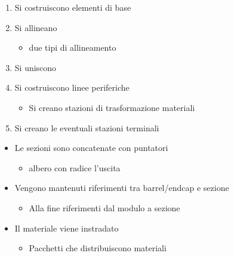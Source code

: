 \documentclass[pdftex, 11pt]{beamer}
\begin{document}
\begin{frame}
  \noindent\begin{minipage}[t]{0.5\linewidth}
    \begin{enumerate}
    \item<2-> Si \alert{costruiscono} elementi di base
    \item<3-> Si \alert{allineano}
      \begin{itemize}
      \item<3-> due tipi di allineamento
      \end{itemize}
    \item<5-> Si \alert{uniscono}
    \item<6-> Si costruiscono linee periferiche
      \begin{itemize}
      \item<6-> Si creano \alert{stazioni} di trasformazione materiali
      \end{itemize}
    \item<7-> Si creano le eventuali stazioni \alert{terminali}
    \end{enumerate}
  \end{minipage}%
  \begin{minipage}[t]{0.5\linewidth}
    \begin{itemize}
    \item<8-> Le sezioni sono concatenate con puntatori
      \begin{itemize}
      \item<8-> \alert{albero} con radice l'uscita
      \end{itemize}
    \item<8-> Vengono mantenuti {riferimenti} tra barrel/endcap e
      sezione 
      \begin{itemize}
      \item<8-> Alla fine riferimenti dal modulo a sezione
      \end{itemize}
    \item<8-> Il materiale viene \alert{instradato}
      \begin{itemize}
      \item<8-> Pacchetti che \alert{distribuiscono} materiali
      \end{itemize}
    \end{itemize}
  \end{minipage}\par\bigskip
\end{frame}
\end{document}
